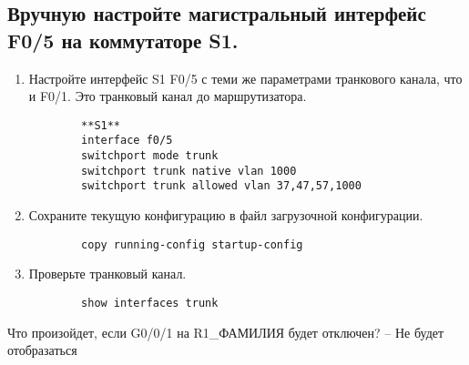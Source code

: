 \subsection{Вручную настройте магистральный интерфейс F0/5 на коммутаторе S1.}
\begin{enumerate}[a]
    \item Настройте интерфейс S1 F0/5 с теми же параметрами транкового канала, что и F0/1.
    Это транковый канал до маршрутизатора.
    \begin{verbatim}
        **S1**
        interface f0/5
        switchport mode trunk
        switchport trunk native vlan 1000
        switchport trunk allowed vlan 37,47,57,1000
    \end{verbatim}

    \item Сохраните текущую конфигурацию в файл загрузочной конфигурации.
    \begin{verbatim}
        copy running-config startup-config
    \end{verbatim}

    \item Проверьте транковый канал.
    \begin{verbatim}
        show interfaces trunk
    \end{verbatim}

\end{enumerate}

Что произойдет, если G0/0/1 на R1\_ФАМИЛИЯ будет отключен?
-- Не будет отобразаться

